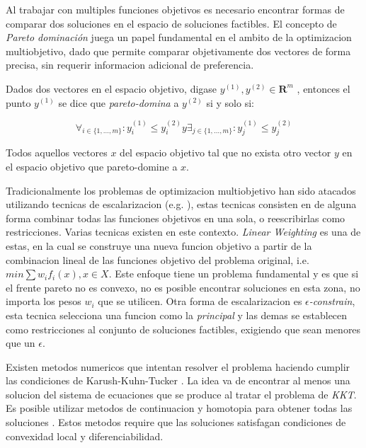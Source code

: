 Al trabajar con multiples funciones objetivos es necesario encontrar formas de comparar dos soluciones en el espacio de soluciones factibles. El concepto de \textit{Pareto dominaci\'on} juega un papel fundamental en el ambito de la optimizacion multiobjetivo, dado que permite comparar objetivamente dos vectores de forma precisa, sin requerir informacion adicional de preferencia.

\begin{definition}
\label{definition:pareto-dominance}

    Dados dos vectores en el espacio objetivo, digase $y^{(1)}, y^{(2)} \in \mathbf{R}^m$ , entonces el punto $y^{(1)}$ se dice que \emph{pareto-domina} a $y^{(2)}$ si y solo si:

    \begin{equation}
        \forall_{i\in\{1,\dots,m\}}: y_i^{(1)} \leq y_i^{(2)} y \exists_{j\in\{1,\dots,m\}}: y_j^{(1)} \le y_j^{(2)}
    \end{equation}
\end{definition}

\begin{definition}
\label{definition:pareto-front}
    Todos aquellos vectores $x$ del espacio objetivo tal que no exista otro vector $y$ en el espacio objetivo que pareto-domine a $x$.
\end{definition}

Tradicionalmente los problemas de optimizacion multiobjetivo han sido atacados utilizando tecnicas de escalarizacion (e.g. \cite{miettinen2012nonlinear}), estas tecnicas consisten en de alguna forma combinar todas las funciones objetivos en una sola, o reescribirlas como restricciones. Varias tecnicas existen en este contexto. \textit{Linear Weighting} es una de estas, en la cual se construye una nueva funcion objetivo a partir de la combinacion lineal de las funciones objetivo del problema original, i.e. $min \sum w_i f_i(x), x \in X$. Este enfoque tiene un problema fundamental y es que si el frente pareto no es convexo, no es posible encontrar soluciones en esta zona, no importa los pesos $w_i$ que se utilicen. Otra forma de escalarizacion es \textit{$\epsilon$-constrain}, esta tecnica selecciona una funcion como la \textit{principal} y las demas se establecen como restricciones al conjunto de soluciones factibles, exigiendo que sean menores que un $\epsilon$.

Existen metodos numericos que intentan resolver el problema haciendo cumplir las condiciones de Karush-Kuhn-Tucker \cite{kuhn2014nonlinear}. La idea va de encontrar al menos una solucion del sistema de ecuaciones que se produce al tratar el problema de \textit{KKT}. Es posible utilizar metodos de continuacion y homotopia para obtener todas las soluciones \cite{hillermeier2001nonlinear, schutze2005continuation}. Estos metodos require que las soluciones satisfagan condiciones de convexidad local y diferenciabilidad.

